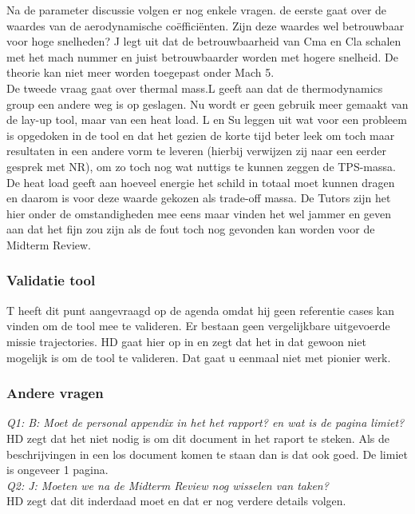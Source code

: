 Na de parameter discussie volgen er nog enkele vragen. de eerste gaat over de waardes van de aerodynamische coëfficiënten. Zijn deze waardes wel betrouwbaar voor hoge snelheden? J legt uit dat de betrouwbaarheid van Cma en Cla schalen met het mach nummer en juist betrouwbaarder worden met hogere snelheid. De theorie kan niet meer worden toegepast onder Mach 5.\\

De tweede vraag gaat over thermal mass.L geeft aan dat de thermodynamics group een andere weg is op geslagen. Nu wordt er geen gebruik meer gemaakt van de lay-up tool, maar van een heat load. L en Su leggen uit wat voor een probleem is opgedoken in de tool en dat het gezien de korte tijd beter leek om toch maar resultaten in een andere vorm te leveren (hierbij verwijzen zij naar een eerder gesprek met NR), om zo toch nog wat nuttigs te kunnen zeggen de TPS-massa. De heat load geeft aan hoeveel energie het schild in totaal moet kunnen dragen en daarom is voor deze waarde gekozen als trade-off massa. De Tutors zijn het hier onder de omstandigheden mee eens maar vinden het wel jammer en geven aan dat het fijn zou zijn als de fout toch nog gevonden kan worden voor de Midterm Review.\\


\subsubsection{Validatie tool}
T heeft dit punt aangevraagd op de agenda omdat hij geen referentie cases kan vinden om de tool mee te valideren. Er bestaan geen vergelijkbare uitgevoerde missie trajectories. HD gaat hier op in en zegt dat het in dat gewoon niet mogelijk is om de tool te valideren. Dat gaat u eenmaal niet met pionier werk.\\

\subsubsection{Andere vragen}
\textit{Q1: B: Moet de personal appendix in het het rapport? en wat is de pagina limiet?} \\
HD zegt dat het niet nodig is om dit document in het raport te steken. Als de beschrijvingen in een los document komen te staan dan is dat ook goed. De limiet is ongeveer 1 pagina.\\

\textit{Q2: J: Moeten we na de Midterm Review nog wisselen van taken?}\\
HD zegt dat dit inderdaad moet en dat er nog verdere details volgen.\\


